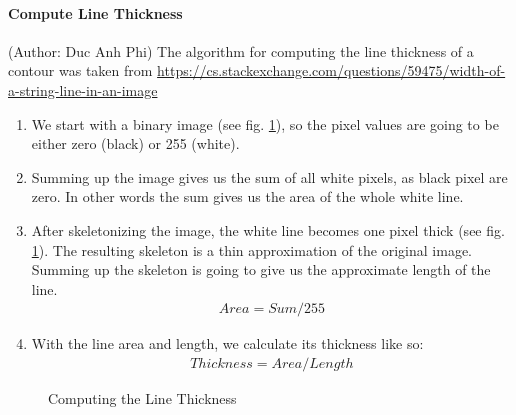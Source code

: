 \documentclass[12pt]{article}
\begin{document}
	\paragraph{Compute Line Thickness} 	\small{(Author: Duc Anh Phi)} The algorithm for computing the line thickness of a contour was taken from \url{https://cs.stackexchange.com/questions/59475/width-of-a-string-line-in-an-image}
	\begin{enumerate}
		\item We start with a binary image (see fig. \ref{fig:linethickness}), so the pixel values are going to be either zero (black) or 255 (white).
		\item Summing up the image gives us the sum of all white pixels, as black pixel are zero. In other words the sum gives us the area of the whole white line.
		\item After skeletonizing the image, the white line becomes one pixel thick (see fig. \ref{fig:linethickness}). The resulting skeleton is a thin approximation of the original image.\\
		Summing up the skeleton is going to give us the approximate length of the line.
		\begin{align}
		Area = Sum/255
		\end{align}
		\item With the line area and length, we calculate its thickness like so:
		\begin{align}
		Thickness = Area / Length
		\end{align}
	\end{enumerate}

	\begin{figure}[h!]
		\centering
		\quad
		
		\caption{Computing the Line Thickness}
		\label{fig:linethickness}
	\end{figure}
	
\end{document}
